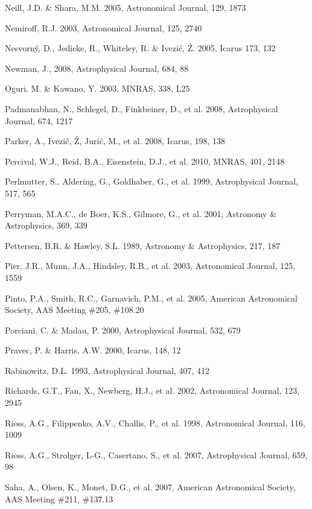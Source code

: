 \documentclass{emulateapj}
\begin{document}
\begin{thebibliography}{}
\bibitem[()]{} Neill, J.D. \& Shara, M.M. 2005, Astronomical Journal, 129, 1873

\bibitem[()]{} Nemiroff, R.J. 2003, Astronomical Journal, 125, 2740

\bibitem[()]{} Nesvorn\'{y}, D., Jedicke, R., Whiteley, R. \& Ivezi\'{c}, \v{Z}. 2005, Icarus 173, 132

\bibitem[()]{} Newman, J., 2008, Astrophysical Journal, 684, 88

\bibitem[()]{} Oguri, M. \& Kawano, Y. 2003, MNRAS, 338, L25 

\bibitem[()]{} Padmanabhan, N., Schlegel, D., Finkbeiner, D., et al. 2008, Astrophysical Journal, 674, 1217

\bibitem[()]{} Parker, A., Ivezi\'{c}, \v{Z}, Juri\'{c}, M., et al. 2008, Icarus, 198, 138

\bibitem[()]{} Percival, W.J., Reid, B.A., Eisenstein, D.J., et al. 2010, MNRAS, 401, 2148 

\bibitem[()]{} Perlmutter, S., Aldering, G., Goldhaber, G., et al. 1999, Astrophysical Journal, 517, 565

\bibitem[()]{} Perryman, M.A.C., de Boer, K.S., Gilmore, G., et al. 2001; Astronomy \& 
             Astrophysics, 369, 339

\bibitem[()]{} Pettersen, B.R. \& Hawley, S.L. 1989, Astronomy \& Astrophysics, 217, 187

\bibitem[()]{} Pier, J.R., Munn, J.A., Hindsley, R.B., et al. 2003, Astronomical Journal, 125, 1559

\bibitem[()]{} Pinto, P.A., Smith, R.C., Garnavich, P.M., et al. 2005, 
              American Astronomical Society, AAS Meeting \#205, \#108.20

\bibitem[()]{} Porciani, C. \& Madau, P. 2000, Astrophysical Journal, 532, 679

\bibitem[()]{} Pravec, P. \& Harris, A.W. 2000, Icarus, 148, 12

\bibitem[()]{} Rabinowitz, D.L. 1993,  Astrophysical Journal, 407, 412

\bibitem[()]{} Richards, G.T., Fan, X., Newberg, H.J., et al. 2002, Astronomical Journal, 123, 2945

\bibitem[()]{} Riess, A.G., Filippenko, A.V., Challis, P., et al. 1998, Astronomical Journal, 116, 1009

\bibitem[()]{} Riess, A.G., Strolger, L-G., Casertano, S., et al. 2007, Astrophysical Journal, 659, 98

\bibitem[()]{} Saha, A., Olsen, K., Monet, D.G., et al. 2007, American Astronomical Society, AAS 
             Meeting \#211, \#137.13


\end{thebibliography}
\end{document}
